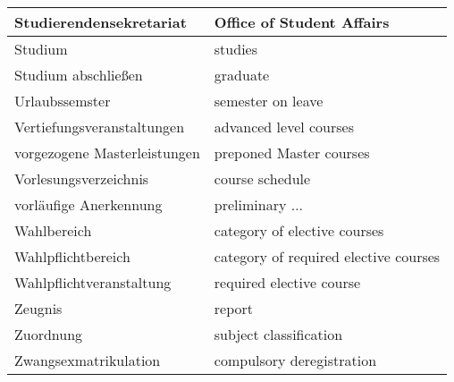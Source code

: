 \begin{longtable} {|p{.5\linewidth}|p{.5\linewidth}|}
    \hline
    Studierendensekretariat             & Office of Student Affairs                                      \\
    \hline
    Studium                             & studies                                                        \\
    \hline
    Studium abschließen                 & graduate                                                       \\
    \hline
    Urlaubssemster                      & semester on leave                                              \\
    \hline
    Vertiefungsveranstaltungen          & advanced level courses                                         \\
    \hline
    vorgezogene Masterleistungen        & preponed Master courses                                        \\
    \hline
    Vorlesungsverzeichnis               & course schedule                                                \\
    \hline
    vorläufige Anerkennung              & preliminary ...                                                \\
    \hline
    Wahlbereich                         & category of elective courses                                   \\
    \hline
    Wahlpflichtbereich                  & category of required elective courses                          \\
    \hline
    Wahlpflichtveranstaltung            & required elective course                                       \\
    \hline
    Zeugnis                             & report                                                         \\
    \hline
    Zuordnung                           & subject classification                                         \\
    \hline
    Zwangsexmatrikulation               & compulsory deregistration                                      \\
    \hline
\end{longtable}






